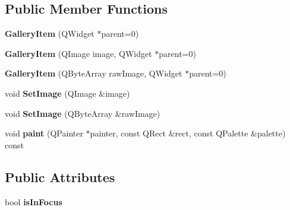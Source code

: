 \subsection*{Public Member Functions}
\begin{DoxyCompactItemize}
\item 
{\bfseries Gallery\+Item} (Q\+Widget $\ast$parent=0)\hypertarget{class_gallery_item_a6a6378ce7933d1a4b47eca274304c197}{}\label{class_gallery_item_a6a6378ce7933d1a4b47eca274304c197}

\item 
{\bfseries Gallery\+Item} (Q\+Image image, Q\+Widget $\ast$parent=0)\hypertarget{class_gallery_item_a1a09ea56fceeada2155c81d202fa96b5}{}\label{class_gallery_item_a1a09ea56fceeada2155c81d202fa96b5}

\item 
{\bfseries Gallery\+Item} (Q\+Byte\+Array raw\+Image, Q\+Widget $\ast$parent=0)\hypertarget{class_gallery_item_a5936087e511bd7c1bf9f084139a6b170}{}\label{class_gallery_item_a5936087e511bd7c1bf9f084139a6b170}

\item 
void {\bfseries Set\+Image} (Q\+Image \&image)\hypertarget{class_gallery_item_a598e7b8ff25a9348418fa7310fdaa457}{}\label{class_gallery_item_a598e7b8ff25a9348418fa7310fdaa457}

\item 
void {\bfseries Set\+Image} (Q\+Byte\+Array \&raw\+Image)\hypertarget{class_gallery_item_a9f32ccbb78113342f47e9f683b2fdc26}{}\label{class_gallery_item_a9f32ccbb78113342f47e9f683b2fdc26}

\item 
void {\bfseries paint} (Q\+Painter $\ast$painter, const Q\+Rect \&rect, const Q\+Palette \&palette) const \hypertarget{class_gallery_item_afa964106e7f294145edd507538277ea0}{}\label{class_gallery_item_afa964106e7f294145edd507538277ea0}

\end{DoxyCompactItemize}
\subsection*{Public Attributes}
\begin{DoxyCompactItemize}
\item 
bool {\bfseries is\+In\+Focus}\hypertarget{class_gallery_item_a338ed1ece114426963316cb69b53babe}{}\label{class_gallery_item_a338ed1ece114426963316cb69b53babe}

\end{DoxyCompactItemize}
